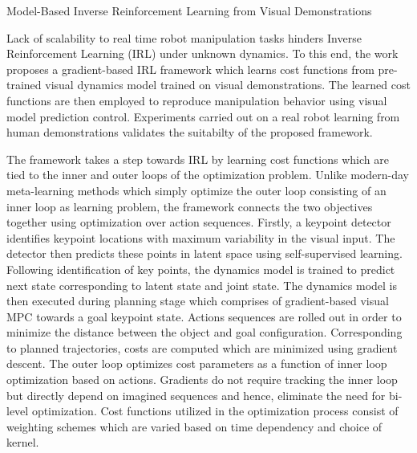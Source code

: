 \documentclass[11pt,letterpaper]{article}
\begin{document}
\begin{center}
  \large{Model-Based Inverse Reinforcement Learning from Visual Demonstrations}
\end{center}

Lack of scalability to real time robot manipulation tasks hinders Inverse Reinforcement Learning (IRL) under unknown dynamics. To this end, the work proposes a gradient-based IRL framework which learns cost functions from pre-trained visual dynamics model trained on visual demonstrations. The learned cost functions are then employed to reproduce manipulation behavior using visual model prediction control. Experiments carried out on a real robot learning from human demonstrations validates the suitabilty of the proposed framework.

The framework takes a step towards IRL by learning cost functions which are tied to the inner and outer loops of the optimization problem. Unlike modern-day meta-learning methods which simply optimize the outer loop consisting of an inner loop as learning problem, the framework connects the two objectives together using optimization over action sequences. Firstly, a keypoint detector identifies keypoint locations with maximum variability in the visual input. The detector then predicts these points in latent space using self-supervised learning. Following identification of key points, the dynamics model is trained to predict next state corresponding to latent state and joint state. The dynamics model is then executed during planning stage which comprises of gradient-based visual MPC towards a goal keypoint state. Actions sequences are rolled out in order to minimize the distance between the object and goal configuration. Corresponding to planned trajectories, costs are computed which are minimized using gradient descent. The outer loop optimizes cost parameters as a function of inner loop optimization based on actions. Gradients do not require tracking the inner loop but directly depend on imagined sequences and hence, eliminate the need for bi-level optimization. Cost functions utilized in the optimization process consist of weighting schemes which are varied based on time dependency and choice of kernel. 
\end{document}
